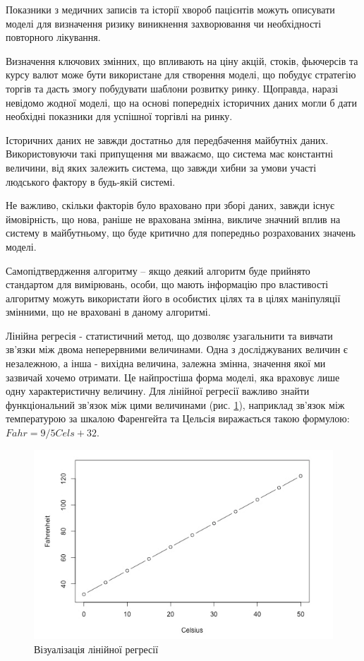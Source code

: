 Показники з медичних записів та історії хвороб пацієнтів можуть описувати моделі для визначення ризику виникнення захворювання чи необхідності повторного лікування.

Визначення ключових змінних, що впливають на ціну акцій, стоків, фьючерсів та курсу валют може бути використане для створення моделі, що побудує стратегію торгів та дасть змогу побудувати шаблони розвитку ринку. Щоправда, наразі невідомо жодної моделі, що на основі попередніх історичних даних могли б дати необхідні показники для успішної торгівлі на ринку.

Історичних даних не завжди достатньо для передбачення майбутніх даних. Використовуючи такі припущення ми вважаємо, що система має константні величини, від яких залежить система, що завжди хибни за умови участі людського фактору в будь-якій системі.

Не важливо, скільки факторів було враховано при зборі даних, завжди існує ймовірність, що нова, раніше не врахована змінна, викличе значний вплив на систему в майбутньому, що буде критично для попередньо розрахованих значень моделі.

Самопідтвердження алгоритму – якщо деякий алгоритм буде прийнято стандартом для вимірювань, особи, що мають інформацію про властивості алгоритму можуть використати його в особистих цілях та в цілях маніпуляції змінними, що не враховані в даному алгоритмі.

Лінійна регресія - статистичний метод, що дозволяє узагальнити та вивчати зв'язки між двома неперервними величинами. Одна з досліджуваних величин є незалежною, а інша - вихідна величина, залежна змінна, значення якої ми зазвичай хочемо отримати. Це найпростіша форма моделі, яка враховує лише одну характеристичну величину. Для лінійної регресії важливо знайти функціональний зв'язок між цими величинами (рис. \ref{fig:linear_regression}), наприклад зв'язок між температурою за шкалою Фаренгейта та Цельсія виражається такою формулою: $Fahr = 9/5Cels + 32$.

\begin{figure}[h!]
  \centering
  \includegraphics[width=0.9\linewidth]{figures/linear_regression.png}
  \caption{Візуалізація лінійної регресії}
  \label{fig:linear_regression}
\end{figure}

